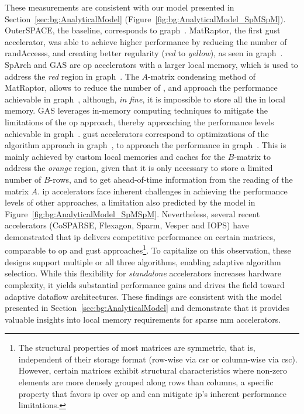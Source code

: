 These measurements are consistent with our model presented in Section~\ref{sec:bg:AnalyticalModel} (Figure~\ref{fig:bg:AnalyticalModel_SpMSpM}).
OuterSPACE, the baseline, corresponds to graph~.
MatRaptor, the first \acrshort{gust} accelerator, was able to achieve higher performance by reducing the number of \glspl{randAccess}, and creating better regularity (\textit{red} to \textit{yellow}), as seen in graph~.
SpArch and GAS are \acrshort{op} accelerators with a larger local memory, which is used to address the \textit{red} region in graph~.
The $A$-matrix condensing method of MatRaptor, allows to reduce the number of , and approach the performance achievable in graph~, although, \textit{in fine}, it is impossible to store all the  in local memory.
GAS leverages in-memory computing techniques to mitigate the limitations of the \acrshort{op} approach, thereby approaching the performance levels achievable in graph~.
\acrshort{gust} accelerators correspond to optimizations of the algorithm approach in graph~, to approach the performance in graph~.
This is mainly achieved by custom local memories and caches for the $B$-matrix to address the \textit{orange} region, given that it is only necessary to store a limited number of $B$-rows, and to get ahead-of-time information from the reading of the matrix $A$.
\acrshort{ip} accelerators face inherent challenges in achieving the performance levels of other approaches, a limitation also predicted by the model in Figure~\ref{fig:bg:AnalyticalModel_SpMSpM}.
Nevertheless, several recent accelerators (\eg CoSPARSE, Flexagon, Sparm, Vesper and IOPS) have demonstrated that \acrshort{ip} delivers competitive performance on certain matrices, comparable to \acrshort{op} and \acrshort{gust} approaches\footnote{The structural properties of most matrices are symmetric, that is, independent of their storage format (\ie row-wise via \acrshort{csr} or column-wise via \acrshort{csc}).
However, certain matrices exhibit structural characteristics where non-zero elements are more densely grouped along rows than columns, a specific property that favors \acrshort{ip} over \acrshort{op} and can mitigate \acrshort{ip}'s inherent performance limitations.}.
To capitalize on this observation, these designs support multiple or all three algorithms, enabling adaptive algorithm selection.
While this flexibility for \textit{standalone} accelerators increases hardware complexity, it yields substantial performance gains and drives the field toward adaptive dataflow architectures.
These findings are consistent with the model presented in Section~\ref{sec:bg:AnalyticalModel} and demonstrate that it provides valuable insights into local memory requirements for sparse \acrshort{mm} accelerators.

